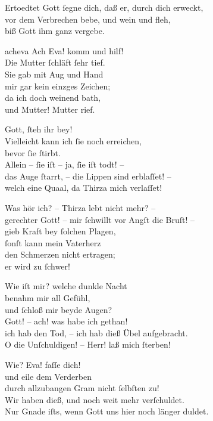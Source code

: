 \documentclass[tocstyle=ref-genre]{ees}
\begin{document}
{\begin{movement}{Ertoedtet}
  Gott ſegne dich, daß er, durch dich erweckt,\\
  vor dem Verbrechen bebe, und wein und fleh,\\
  biß Gott ihm ganz vergebe.
\end{movement}

\begin{movement}{acheva}
  \voice[Hamiel]
  Ach Eva! komm und hilf!\\
  Die Mutter ſchläft ſehr tief.\\
  Sie gab mit Aug und Hand\\
  mir gar kein einzges Zeichen;\\
  da ich doch weinend bath,\\
  und Mutter! Mutter rief.

  \voice[Eva]
  Gott, ſteh ihr bey!\\
  Vielleicht kann ich ſie noch erreichen,\\
  bevor ſie ſtirbt.\\
  Allein – ſie iſt – ja, ſie iſt todt! –\\
  das Auge ſtarrt, – die Lippen sind erblaſſet! –\\
  welch eine Quaal, da Thirza mich verlaſſet!

  \voice[Adam]
  Was hör ich? – Thirza lebt nicht mehr? –\\
  gerechter Gott! – mir ſchwillt vor Angſt die Bruſt! –\\
  gieb Kraft bey ſolchen Plagen,\\
  ſonſt kann mein Vaterherz\\
  den Schmerzen nicht ertragen;\\
  er wird zu ſchwer!

  \voice[Eva]
  Wie iſt mir? welche dunkle Nacht\\
  benahm mir all Gefühl,\\
  und ſchloß mir beyde Augen?\\
  Gott! – ach! was habe ich gethan!\\
  ich hab den Tod, – ich hab dieß Übel aufgebracht.\\
  O die Unſchuldigen! – Herr! laß mich ſterben!

  \voice[Adam]
  Wie? Eva! faſſe dich!\\
  und eile dem Verderben\\
  durch allzubangen Gram nicht ſelbſten zu!\\
  Wir haben dieß, und noch weit mehr verſchuldet.\\
  Nur Gnade iſts, wenn Gott uns hier noch länger duldet.


\end{movement}}
\end{document}
